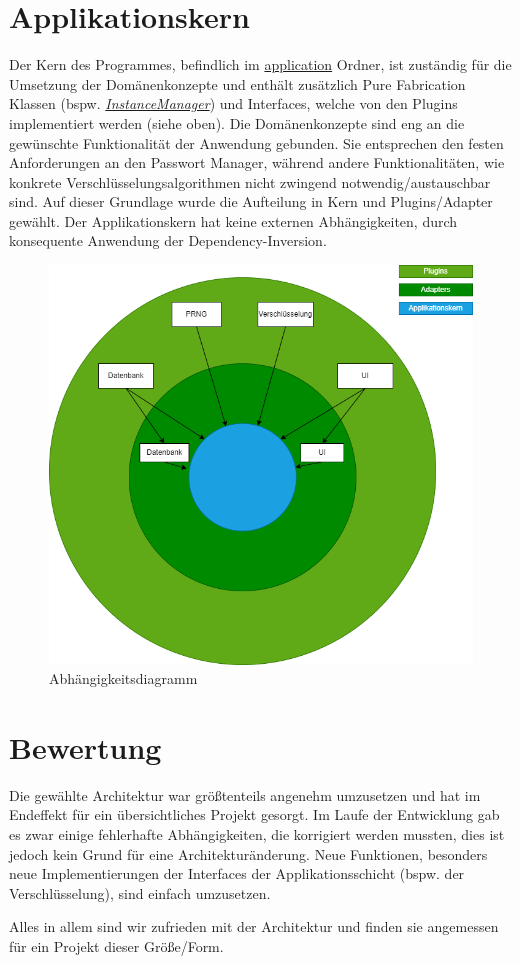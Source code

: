 \section{Applikationskern}

Der Kern des Programmes, befindlich im \href{https://github.com/moorts/Morik/tree/main/src/application}{application} Ordner, ist zuständig für die Umsetzung der Domänenkonzepte und enthält zusätzlich Pure Fabrication Klassen (bspw. \href{https://github.com/moorts/Morik/blob/main/src/application/InstanceManager.h}{\textit{InstanceManager}}) und Interfaces, welche von den Plugins implementiert werden (siehe oben). Die Domänenkonzepte sind eng an die gewünschte Funktionalität der Anwendung gebunden. Sie entsprechen den festen Anforderungen an den Passwort Manager, während andere Funktionalitäten, wie konkrete Verschlüsselungsalgorithmen nicht zwingend notwendig/austauschbar sind. Auf dieser Grundlage wurde die Aufteilung in Kern und Plugins/Adapter gewählt. Der Applikationskern hat keine externen Abhängigkeiten, durch konsequente Anwendung der Dependency-Inversion. 

\begin{figure}[ht]
	\centering
	\includegraphics[width=1.0\textwidth]{Bilder/architecture_diagram.png}
	\caption{Abhängigkeitsdiagramm}
	\label{fig:CADiag}
\end{figure}

\section{Bewertung}

Die gewählte Architektur war größtenteils angenehm umzusetzen und hat im Endeffekt für ein übersichtliches Projekt gesorgt. Im Laufe der Entwicklung gab es zwar einige fehlerhafte Abhängigkeiten, die korrigiert werden mussten, dies ist jedoch kein Grund für eine Architekturänderung. Neue Funktionen, besonders neue Implementierungen der Interfaces der Applikationsschicht (bspw. der Verschlüsselung), sind einfach umzusetzen.

Alles in allem sind wir zufrieden mit der Architektur und finden sie angemessen für ein Projekt dieser Größe/Form.
